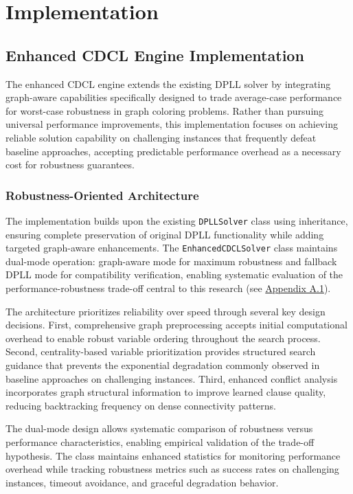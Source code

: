 \section{Implementation}

\subsection{Enhanced CDCL Engine Implementation}

The enhanced CDCL engine extends the existing DPLL solver by integrating graph-aware capabilities specifically designed to trade average-case performance for worst-case robustness in graph coloring problems. Rather than pursuing universal performance improvements, this implementation focuses on achieving reliable solution capability on challenging instances that frequently defeat baseline approaches, accepting predictable performance overhead as a necessary cost for robustness guarantees.

\subsubsection{Robustness-Oriented Architecture}

The implementation builds upon the existing \texttt{DPLLSolver} class using inheritance, ensuring complete preservation of original DPLL functionality while adding targeted graph-aware enhancements. The \texttt{EnhancedCDCLSolver} class maintains dual-mode operation: graph-aware mode for maximum robustness and fallback DPLL mode for compatibility verification, enabling systematic evaluation of the performance-robustness trade-off central to this research (see \hyperref[appendix:enhanced-cdcl-class]{Appendix A.1}).

The architecture prioritizes reliability over speed through several key design decisions. First, comprehensive graph preprocessing accepts initial computational overhead to enable robust variable ordering throughout the search process. Second, centrality-based variable prioritization provides structured search guidance that prevents the exponential degradation commonly observed in baseline approaches on challenging instances. Third, enhanced conflict analysis incorporates graph structural information to improve learned clause quality, reducing backtracking frequency on dense connectivity patterns.

The dual-mode design allows systematic comparison of robustness versus performance characteristics, enabling empirical validation of the trade-off hypothesis. The class maintains enhanced statistics for monitoring performance overhead while tracking robustness metrics such as success rates on challenging instances, timeout avoidance, and graceful degradation behavior.

